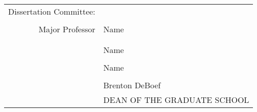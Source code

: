 \begin{tabular}{rl}
  {Dissertation} Committee:\hspace{0.5in}\mbox{}\\\\   %
 Major Professor
  & Name \\\vspace{0.4pt}\\ \vspace{-1.0em}\\%
  & Name \\\vspace{0.4pt}\\ %
  & Name \\\vspace{0.4pt}\\ %
  & %
               Brenton DeBoef \\
   & 		DEAN OF THE GRADUATE SCHOOL\\
\end{tabular}

